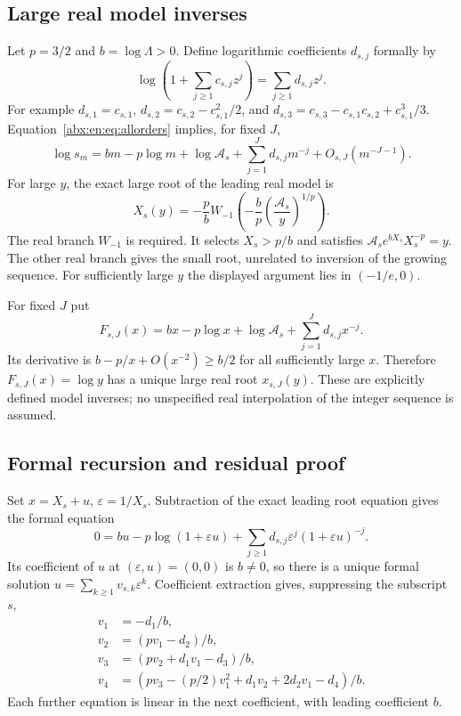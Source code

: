 \documentclass[11pt,letterpaper]{article}
\numberwithin{equation}{section}
\theoremstyle{remark}\newtheorem{remark}[theorem]{Remark}
\newcommand{\eps}{\varepsilon}
\begin{document}
\subsection{Large real model inverses}\label{abx:en:sub:model}
Let $p=3/2$ and $b=\log\Lambda>0$. Define logarithmic coefficients
$d_{s,j}$ formally by
\begin{equation}\label{abx:en:eq:logcoeff}
 \log\left(1+\sum_{j\ge1}c_{s,j}z^j\right)
       =\sum_{j\ge1}d_{s,j}z^j.
\end{equation}
For example $d_{s,1}=c_{s,1}$,
$d_{s,2}=c_{s,2}-c_{s,1}^2/2$, and
$d_{s,3}=c_{s,3}-c_{s,1}c_{s,2}+c_{s,1}^3/3$.
Equation~\eqref{abx:en:eq:allorders} implies, for fixed $J$,
\begin{equation}\label{abx:en:eq:log-forward}
 \log s_m= b m-p\log m+\log\mathcal A_s
           +\sum_{j=1}^Jd_{s,j}m^{-j}+O_{s,J}(m^{-J-1}).
\end{equation}
For large $y$, the exact large root of the leading real model is
\begin{equation}\label{abx:en:eq:Lambert}
 X_s(y)=-\frac{p}{b}
 W_{-1}\left(-\frac{b}{p}\left(\frac{\mathcal A_s}{y}\right)^{1/p}\right).
\end{equation}
The real branch $W_{-1}$ is required. It selects $X_s>p/b$ and
satisfies $\mathcal A_s e^{bX_s}X_s^{-p}=y$.
The other real branch gives the small root, unrelated to inversion of
the growing sequence. For sufficiently large $y$ the displayed argument
lies in $(-1/e,0)$.

For fixed $J$ put
\[
 F_{s,J}(x)=b x-p\log x+\log\mathcal A_s
                   +\sum_{j=1}^Jd_{s,j}x^{-j}.
\]
Its derivative is $b-p/x+O(x^{-2})\ge b/2$ for all sufficiently
large $x$. Therefore $F_{s,J}(x)=\log y$ has a unique large real
root $x_{s,J}(y)$. These are explicitly defined model inverses; no
unspecified real interpolation of the integer sequence is assumed.

\subsection{Formal recursion and residual proof}\label{abx:en:sub:formal}
Set $x=X_s+u$, $\eps=1/X_s$. Subtraction of the exact leading
root equation gives the formal equation
\begin{equation}\label{abx:en:eq:inverse-formal}
 0=b u-p\log(1+\eps u)
       +\sum_{j\ge1}d_{s,j}\eps^j(1+\eps u)^{-j}.
\end{equation}
Its coefficient of $u$ at $(\eps,u)=(0,0)$ is $b\ne0$, so there
is a unique formal solution $u=\sum_{k\ge1}v_{s,k}\eps^k$.
Coefficient extraction gives, suppressing the subscript $s$,
\begin{align}
 v_1&=-d_1/b,\nonumber\\
 v_2&=(pv_1-d_2)/b,\nonumber\\
 v_3&=(pv_2+d_1v_1-d_3)/b,\label{abx:en:eq:vcoeff}\\
 v_4&=(pv_3-(p/2)v_1^2+d_1v_2+2d_2v_1-d_4)/b.\nonumber
\end{align}
Each further equation is linear in the next coefficient, with leading
coefficient $b$.
\end{document}
